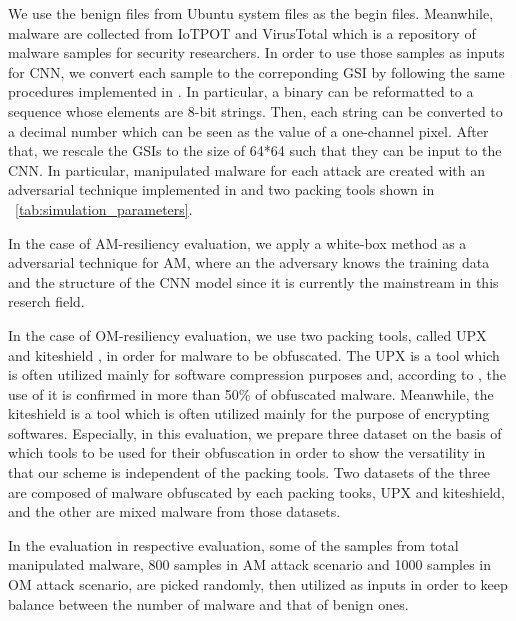 We use the benign files from Ubuntu system files \cite{ubuntu} as the begin files.
Meanwhile, malware are collected from IoTPOT \cite{iotpot} and VirusTotal \cite{virustotal} which is a repository of malware samples for security researchers.
In order to use those samples as inputs for CNN, we convert each sample to the correponding GSI by following the same procedures implemented in \cite{previous}.
In particular, a binary can be reformatted to a sequence whose elements are 8-bit strings.
Then, each string can be converted to a decimal number which can be seen as the value of a one-channel pixel.
After that, we rescale the GSIs to the size of 64*64 such that they can be input to the CNN.
In particular, manipulated malware for each attack are created with an adversarial technique implemented in \cite{am, yamafumi} and two packing tools \cite{upx, kiteshield} shown in \tablename~\ref{tab:simulation_parameters}.

In the case of AM-resiliency evaluation, we apply a white-box method as a adversarial technique for AM, where an the adversary knows the training data and the structure of the CNN model since it is currently the mainstream in this reserch field.

In the case of OM-resiliency evaluation, we use two packing tools, called UPX \cite{upx} and kiteshield \cite{kiteshield}, in order for malware to be obfuscated.
The UPX is a tool which is often utilized mainly for software compression purposes and, according to \cite{pack_research}, the use of it is confirmed in more than 50\% of obfuscated malware. 
Meanwhile, the kiteshield is a tool which is often utilized mainly for the purpose of encrypting softwares.
Especially, in this evaluation, we prepare three dataset on the basis of which tools to be used for their obfuscation in order to show the versatility in that our scheme is independent of the packing tools.
Two datasets of the three are composed of malware obfuscated by each packing tooks, UPX and kiteshield, and the other are mixed malware from those datasets. 

In the evaluation in respective evaluation, some of the samples from total manipulated malware, 800 samples in AM attack scenario and 1000 samples in OM attack scenario, are picked randomly, then utilized as inputs in order to keep balance between the number of malware and that of benign ones.

